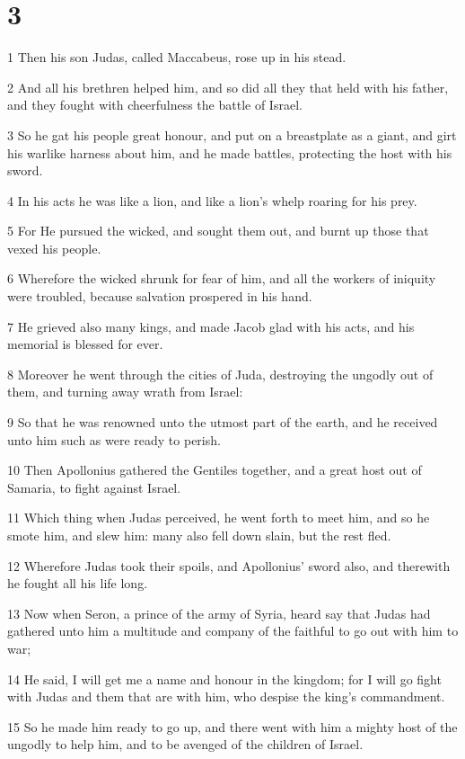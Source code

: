 \chapter{3}

\par 1 Then his son Judas, called Maccabeus, rose up in his stead.
\par 2 And all his brethren helped him, and so did all they that held with his father, and they fought with cheerfulness the battle of Israel.
\par 3 So he gat his people great honour, and put on a breastplate as a giant, and girt his warlike harness about him, and he made battles, protecting the host with his sword.
\par 4 In his acts he was like a lion, and like a lion's whelp roaring for his prey.
\par 5 For He pursued the wicked, and sought them out, and burnt up those that vexed his people.
\par 6 Wherefore the wicked shrunk for fear of him, and all the workers of iniquity were troubled, because salvation prospered in his hand.
\par 7 He grieved also many kings, and made Jacob glad with his acts, and his memorial is blessed for ever.
\par 8 Moreover he went through the cities of Juda, destroying the ungodly out of them, and turning away wrath from Israel:
\par 9 So that he was renowned unto the utmost part of the earth, and he received unto him such as were ready to perish.
\par 10 Then Apollonius gathered the Gentiles together, and a great host out of Samaria, to fight against Israel.
\par 11 Which thing when Judas perceived, he went forth to meet him, and so he smote him, and slew him: many also fell down slain, but the rest fled.
\par 12 Wherefore Judas took their spoils, and Apollonius' sword also, and therewith he fought all his life long.
\par 13 Now when Seron, a prince of the army of Syria, heard say that Judas had gathered unto him a multitude and company of the faithful to go out with him to war;
\par 14 He said, I will get me a name and honour in the kingdom; for I will go fight with Judas and them that are with him, who despise the king's commandment.
\par 15 So he made him ready to go up, and there went with him a mighty host of the ungodly to help him, and to be avenged of the children of Israel.
